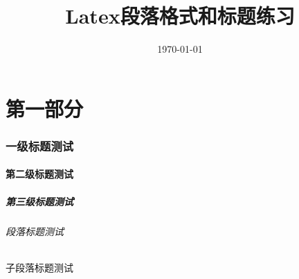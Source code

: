 \documentclass[UTF8]{article}
\title{Latex段落格式和标题练习}
\date{\today}
\begin{document}
\maketitle
\part {第一部分}
\section{一级标题测试}
\subsection{第二级标题测试}
\subsubsection{第三级标题测试}
\paragraph{段落标题测试}
\subparagraph{子段落标题测试}
\end{document}
